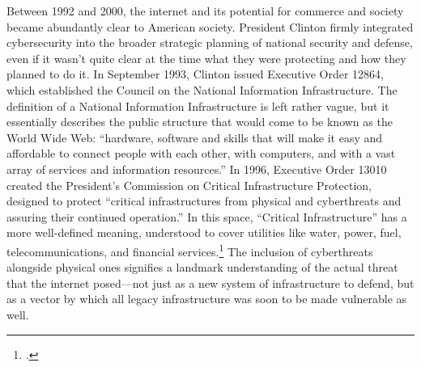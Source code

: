 \documentclass{memoir}
\begin{document}
\begin{refsegment}
Between 1992 and 2000, the internet and its potential for commerce and society became abundantly clear to American society. President Clinton firmly integrated cybersecurity into the broader strategic planning of national security and defense, even if it wasn't quite clear at the time what they were protecting and how they planned to do it. In September 1993, Clinton issued Executive Order 12864, which established the Council on the National Information Infrastructure. The definition of a National Information Infrastructure is left rather vague, but it essentially describes the public structure that would come to be known as the World Wide Web: ``hardware, software and skills that will make it easy and affordable to connect people with each other, with computers, and with a vast array of services and information resources.'' In 1996, Executive Order 13010 created the President's Commission on Critical Infrastructure Protection, designed to protect ``critical infrastructures from physical and cyberthreats and assuring their continued operation.'' In this space, ``Critical Infrastructure'' has a more well-defined meaning, understood to cover utilities like water, power, fuel, telecommunications, and financial services.\footcite[~p.761. Completely omitted from this thesis is the concurrent debate about the role the government should play in regulating encryption technology. At the same time it was drafting the Executive Orders mentioned above, the Clinton administration was also taking executive action to manage encryption. The encryption debate (which is still ongoing today) raises a lot of questions about the relationship between the federal government, civil liberties, and law enforcement, as well as more generic national security concerns. It is however mostly irrelevant the specific international political questions that motivate this inquriy, and as such is not included here.]{boys_clinton_2018} The inclusion of cyberthreats alongside physical ones signifies a landmark understanding of the actual threat that the internet posed---not just as a new system of infrastructure to defend, but as a vector by which all legacy infrastructure was soon to be made vulnerable as well.


\end{refsegment}
\end{document}
